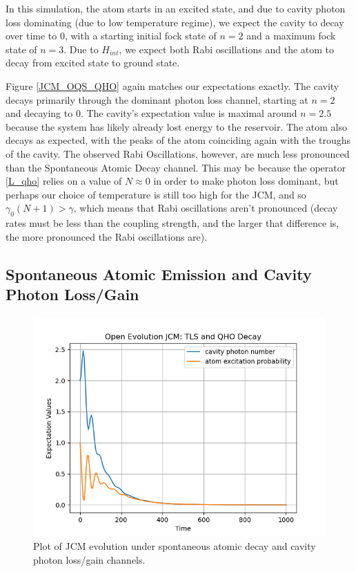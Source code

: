 \documentclass[12pt]{article}
\begin{document}
In this simulation, the atom starts in an excited state, and due to cavity photon loss dominating (due to low temperature regime), we expect the cavity to decay over time to 0, with a starting initial fock state of $n=2$ and a maximum fock state of $n=3$. Due to $H_{int}$, we expect both Rabi oscillations and the atom to decay from excited state to ground state.

Figure \ref{JCM_OQS_QHO} again matches our expectations exactly. The cavity decays primarily through the dominant photon loss channel, starting at $n=2$ and decaying to 0. The cavity's expectation value is maximal around $n=2.5$ because the system has likely already lost energy to the reservoir. The atom also decays as expected, with the peaks of the atom coinciding again with the troughs of the cavity. The observed Rabi Oscillations, however, are much less pronounced than the Spontaneous Atomic Decay channel. This may be because the operator \eqref{L_qho} relies on a value of $N \approx 0$ in order to make photon loss dominant, but perhaps our choice of temperature is still too high for the JCM, and so $\gamma_0 (N+1) > \gamma$, which means that Rabi oscillations aren't pronounced (decay rates must be less than the coupling strength, and the larger that difference is, the more pronounced the Rabi oscillations are). 

\subsection{Spontaneous Atomic Emission and Cavity Photon Loss/Gain}

\begin{figure}[h]
    \centering
    \includegraphics[width=\linewidth]{Research Project/Code/results/JCM/OQS_QHOTLS.png}
    \caption{Plot of JCM evolution under spontaneous atomic decay and cavity photon loss/gain channels.}
    \label{JCM_OQS_QHOTLS}
\end{figure}
\end{document}
